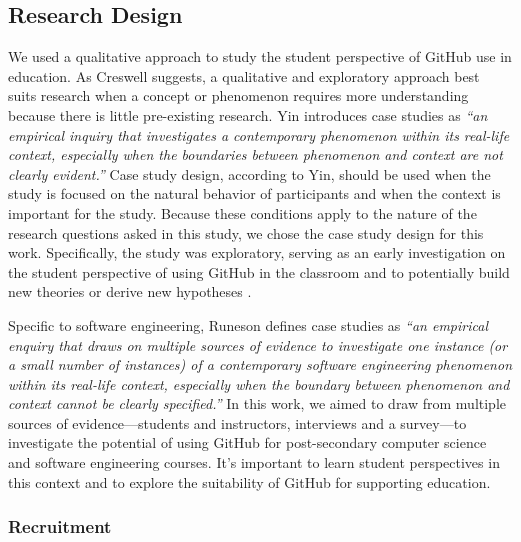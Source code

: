\subsection{Research Design}
We used a qualitative approach to study the student perspective of GitHub use in education. As Creswell \cite{creswell2013research} suggests, a qualitative and exploratory approach best suits research when a concept or phenomenon requires more understanding because there is little pre-existing research. Yin \cite{yin2013case} introduces case studies as \textit{``an empirical inquiry that investigates a contemporary phenomenon within its real-life context, especially when the boundaries between phenomenon and context are not clearly evident.''} Case study design, according to Yin, should be used when the study is focused on the natural behavior of participants and when the context is important for the study. Because these conditions apply to the nature of the research questions asked in this study, we chose the case study design for this work. Specifically, the study was exploratory, serving as an early investigation on the student perspective of using GitHub in the classroom and to potentially build new theories or derive new hypotheses \cite{easterbrook2008selecting}.

Specific to software engineering, Runeson \cite{runeson2012case} defines case studies as \textit{``an empirical enquiry that draws on multiple sources of evidence to investigate one instance (or a small number of instances) of a contemporary software engineering phenomenon within its real-life context, especially when the boundary between phenomenon and context cannot be clearly specified.''} In this work, we aimed to draw from multiple sources of evidence---students and instructors, interviews and a survey---to investigate the potential of using GitHub for post-secondary computer science and software engineering courses. It's important to learn student perspectives in this context and to explore the suitability of GitHub for supporting education.

\subsubsection{Recruitment}

